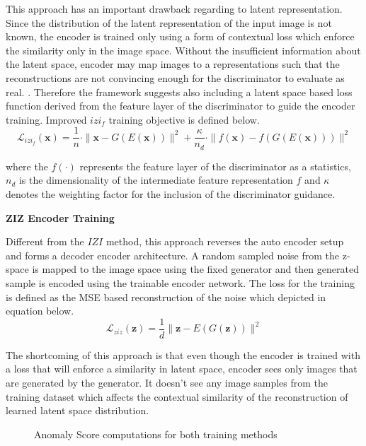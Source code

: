 This approach has an important drawback regarding to latent representation. Since the distribution
of the latent representation of the input image is not known, the encoder is trained only using a
form of contextual loss which enforce the similarity only in the image space. Without the
insufficient information about the latent space, encoder may map images to a representations such
that the reconstructions are not convincing enough for the discriminator to evaluate as real.
\cite{pub.1111824956}. Therefore the framework suggests also including a latent space based loss
function derived from the feature layer of the discriminator to guide the encoder training. Improved
$izi_{f}$ training objective is defined below.
\begin{equation}
	\mathcal{L}_{i z i_{f}}(\mathbf{x})=\frac{1}{n} \cdot\|\mathbf{x}-G(E(\mathbf{x}))\|^{2}+\frac{\kappa}{n_{d}} \cdot\|f(\mathbf{x})-f(G(E(\mathbf{x})))\|^{2}
\end{equation}

where the $f(\cdot)$ represents the feature layer of the discriminator as a statistics, $n_{d}$ is
the dimensionality of the intermediate feature representation $f$ and $\kappa$ denotes the weighting
factor for the inclusion of the discriminator guidance.

\textbf{ZIZ Encoder Training}

Different from the $IZI$ method, this approach reverses the auto encoder setup and forms a decoder
encoder architecture. A random sampled noise from the z-space is mapped to the image space using the
fixed generator and then generated sample is encoded using the trainable encoder network. The loss
for the training is defined as the MSE based reconstruction of the noise which depicted in equation
below. 
\begin{equation}
	\mathcal{L}_{z i z}(\mathbf{z})=\frac{1}{d}\|\mathbf{z}-E(G(\mathbf{z}))\|^{2}
\end{equation}

The shortcoming of this approach is that even though the encoder is trained with a loss that will
enforce a similarity in latent space, encoder sees only images that are generated by the generator.
It doesn't see any image samples from the training dataset which affects the contextual similarity
of the reconstruction of learned latent space distribution. 
\begin{figure}[h!] 
	\hspace*{\fill}%
	\caption{Anomaly Score computations for both training methods \cite{pub.1111824956}}
	\label{fig:fanogan_anomaly_score}
\end{figure}

